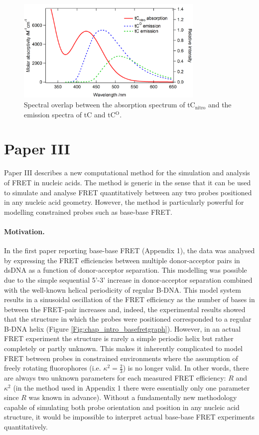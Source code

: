 \begin{figure}
    \centering
        \includegraphics[width=0.8\textwidth]{adds//jpcb_fig2.png}
    \captionsetup{width=.95\textwidth}
    \caption{Spectral overlap between the absorption spectrum of tC$_\mathrm{nitro}$ and the emission spectra of tC and tC$^\mathrm{O}$.}
    \label{Fig:chap_Papers_JPCB2}
\end{figure}

\section{Paper III}
 Paper III describes a new computational method for the simulation and analysis of FRET in nucleic acids. The method is generic in the sense that it can be used to simulate and analyse FRET quantitatively between any two probes positioned in any nucleic acid geometry. However, the method is particularly powerful for modelling constrained probes such as base-base FRET.

 \paragraph{Motivation.} In the first paper reporting base-base FRET (Appendix 1), the data was analysed by expressing the FRET efficiencies between multiple donor-acceptor pairs in dsDNA as a function of donor-acceptor separation.\cite{Borjesson2009a} This modelling was possible due to the simple sequential 5'-3' increase in donor-acceptor separation combined with the well-known helical periodicity of regular B-DNA. This model system results in a sinusoidal oscillation of the FRET efficiency as the number of bases in between the FRET-pair increases and, indeed, the experimental results showed that the structure in which the probes were positioned corresponded to a regular B-DNA helix (Figure \ref{Fig:chap_intro_basefretgraph}). However, in an actual FRET experiment the structure is rarely a simple periodic helix but rather completely or partly unknown. This makes it inherently complicated to model FRET between probes in constrained environments where the assumption of freely rotating fluorophores (i.e. $\kappa^2=\frac{2}{3}$) is no longer valid. In other words, there are always two unknown parameters for each measured FRET efficiency: $R$ and $\kappa^2$ (in the method used in Appendix 1 there were essentially only one parameter since $R$ was known in advance). Without a fundamentally new methodology capable of simulating both probe orientation and position in any nucleic acid structure, it would be impossible to interpret actual base-base FRET experiments quantitatively.

